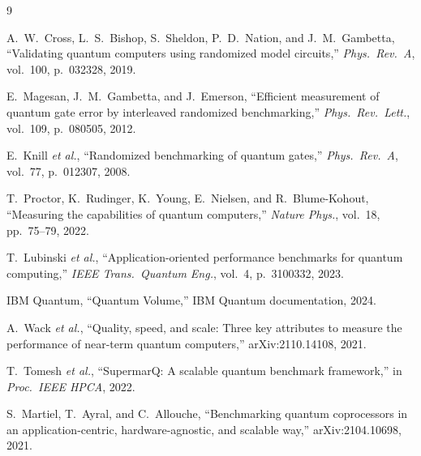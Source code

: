 \documentclass[conference]{IEEEtran}
\begin{document}
\begin{thebibliography}{9}

A.~W.~Cross, L.~S.~Bishop, S.~Sheldon, P.~D.~Nation, and J.~M.~Gambetta,
``Validating quantum computers using randomized model circuits,''
\textit{Phys.\ Rev.\ A}, vol.~100, p.~032328, 2019.

E.~Magesan, J.~M.~Gambetta, and J.~Emerson,
``Efficient measurement of quantum gate error by interleaved randomized benchmarking,''
\textit{Phys.\ Rev.\ Lett.}, vol.~109, p.~080505, 2012.

E.~Knill \textit{et al.},
``Randomized benchmarking of quantum gates,''
\textit{Phys.\ Rev.\ A}, vol.~77, p.~012307, 2008.

T.~Proctor, K.~Rudinger, K.~Young, E.~Nielsen, and R.~Blume-Kohout,
``Measuring the capabilities of quantum computers,''
\textit{Nature Phys.}, vol.~18, pp.~75--79, 2022.

T.~Lubinski \textit{et al.},
``Application-oriented performance benchmarks for quantum computing,''
\textit{IEEE Trans.\ Quantum Eng.}, vol.~4, p.~3100332, 2023.

IBM Quantum,
``Quantum Volume,''
IBM Quantum documentation, 2024.

A.~Wack \textit{et al.},
``Quality, speed, and scale: Three key attributes to measure the performance of near-term quantum computers,''
arXiv:2110.14108, 2021.

T.~Tomesh \textit{et al.},
``SupermarQ: A scalable quantum benchmark framework,''
in \textit{Proc.\ IEEE HPCA}, 2022.

S.~Martiel, T.~Ayral, and C.~Allouche,
``Benchmarking quantum coprocessors in an application-centric, hardware-agnostic, and scalable way,''
arXiv:2104.10698, 2021.

\end{thebibliography}
\end{document}
